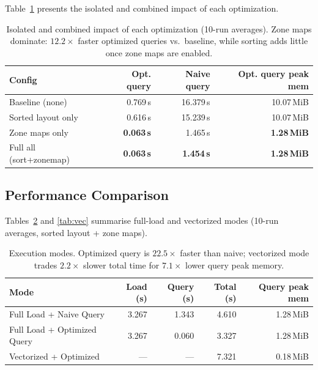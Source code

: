 \documentclass[11pt,a4paper]{article}
\begin{document}
Table~\ref{tab:optim} presents the isolated and combined impact of each optimization.

\begin{table}[H]
\centering
\small
\setlength{\tabcolsep}{4pt}
\begin{tabular}{l r r r}
\toprule
\textbf{Config} & \textbf{Opt. query} & \textbf{Naive query} & \textbf{Opt. query peak mem} \\
\midrule
Baseline (none)             & 0.769\,s & 16.379\,s & 10.07\,MiB \\
Sorted layout only          & 0.616\,s & 15.239\,s & 10.07\,MiB \\
Zone maps only              & \textbf{0.063\,s} & 1.465\,s & \textbf{1.28\,MiB} \\
Full all (sort+zonemap)     & \textbf{0.063\,s} & \textbf{1.454\,s} & \textbf{1.28\,MiB} \\
\bottomrule
\end{tabular}
\caption{Isolated and combined impact of each optimization (10-run averages). Zone maps dominate: $12.2\times$ faster optimized queries vs.\ baseline, while sorting adds little once zone maps are enabled.}
\label{tab:optim}
\end{table}

\subsection{Performance Comparison}

Tables~\ref{tab:perf} and \ref{tab:vec} summarise full-load and vectorized modes (10-run averages, sorted layout + zone maps).

\begin{table}[H]
\centering
\small
\begin{tabular}{l r r r r}
\toprule
\textbf{Mode} & \textbf{Load (s)} & \textbf{Query (s)} & \textbf{Total (s)} & \textbf{Query peak mem} \\
\midrule
Full Load + Naive Query     & 3.267 & 1.343 & 4.610 & 1.28\,MiB \\
Full Load + Optimized Query & 3.267 & 0.060 & 3.327 & 1.28\,MiB \\
Vectorized + Optimized      & --- & --- & 7.321 & 0.18\,MiB \\
\bottomrule
\end{tabular}
\caption{Execution modes. Optimized query is $22.5\times$ faster than naive; vectorized mode trades $2.2\times$ slower total time for $7.1\times$ lower query peak memory.}
\label{tab:perf}
\end{table}
\label{tab:vec}
\end{document}
